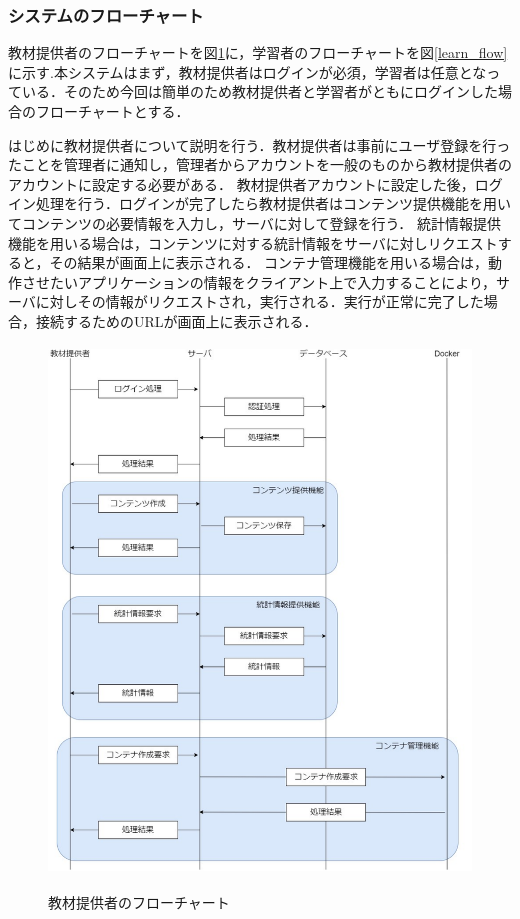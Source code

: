 \newpage
\subsubsection{システムのフローチャート}
教材提供者のフローチャートを図\ref{provider_flow}に，学習者のフローチャートを図\ref{learn_flow}に示す.本システムはまず，教材提供者はログインが必須，学習者は任意となっている．そのため今回は簡単のため教材提供者と学習者がともにログインした場合のフローチャートとする．

はじめに教材提供者について説明を行う．教材提供者は事前にユーザ登録を行ったことを管理者に通知し，管理者からアカウントを一般のものから教材提供者のアカウントに設定する必要がある．
教材提供者アカウントに設定した後，ログイン処理を行う．ログインが完了したら教材提供者はコンテンツ提供機能を用いてコンテンツの必要情報を入力し，サーバに対して登録を行う．
統計情報提供機能を用いる場合は，コンテンツに対する統計情報をサーバに対しリクエストすると，その結果が画面上に表示される．
コンテナ管理機能を用いる場合は，動作させたいアプリケーションの情報をクライアント上で入力することにより，サーバに対しその情報がリクエストされ，実行される．実行が正常に完了した場合，接続するためのURLが画面上に表示される．

\begin{figure}[htbp]
    \begin{center}
        \includegraphics[width=15cm,height=14cm,keepaspectratio]{provider_flow-crop.pdf}\\
    \end{center}
    \caption{教材提供者のフローチャート}
    \label{provider_flow}
\end{figure}

